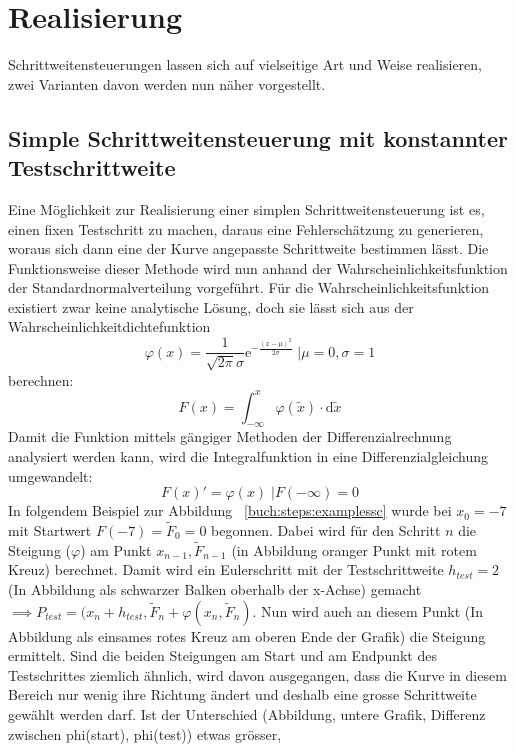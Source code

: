 %
%
%
\section{Realisierung
  \label{steps:section:loesung}}
Schrittweitensteuerungen lassen sich auf vielseitige Art und Weise realisieren,
zwei Varianten davon werden nun näher vorgestellt.

\subsection{Simple Schrittweitensteuerung mit konstannter Testschrittweite
  \label{steps:subsection:simplestep}}
Eine Möglichkeit zur Realisierung einer simplen Schrittweitensteuerung ist es, einen fixen Testschritt zu machen,
daraus eine Fehlerschätzung zu generieren, woraus sich dann eine der Kurve angepasste Schrittweite bestimmen lässt.
Die Funktionsweise dieser Methode wird nun anhand der Wahrscheinlichkeitsfunktion der Standardnormalverteilung vorgeführt.
Für die Wahrscheinlichkeitsfunktion existiert zwar keine analytische Lösung,
doch sie lässt sich aus der Wahrscheinlichkeitdichtefunktion
\[
  \varphi(x)=\frac{1}{\sqrt{2\pi}\sigma}\mathrm{e}^{-\frac{(x-\mu)^2}{2 \sigma}}\;|\mu=0,\sigma=1
\]
berechnen:
\[
  F(x)=\int_{-\infty}^{x} \varphi (\tilde{x}) \cdot \mathrm{d} \tilde{x}
\]
Damit die Funktion mittels gängiger Methoden der Differenzialrechnung analysiert werden kann,
wird die Integralfunktion in eine Differenzialgleichung umgewandelt:
\[
  F(x)'=\varphi(x)\;|F(-\infty)=0
\]
In folgendem Beispiel zur Abbildung ~\ref{buch:steps:examplessc} wurde bei $x_0=-7$ mit Startwert $F(-7)=\tilde{F}_0=0$ begonnen.
Dabei wird für den Schritt $n$ die Steigung ($\varphi$) am Punkt $x_{n-1}, \tilde{F}_{n-1}$ (in Abbildung oranger Punkt mit rotem Kreuz) berechnet.
Damit wird ein Eulerschritt mit der Testschrittweite $h_{test}=2$ (In Abbildung als schwarzer Balken oberhalb der x-Achse) gemacht
$\implies P_{test}=(x_n+h_{test}, \tilde{F}_n+\varphi(x_n, \tilde{F}_n)$.
Nun wird auch an diesem Punkt (In Abbildung als einsames rotes Kreuz am oberen Ende der Grafik) die Steigung ermittelt.
Sind die beiden Steigungen am Start und am Endpunkt des Testschrittes ziemlich ähnlich, wird davon ausgegangen,
dass die Kurve in diesem Bereich nur wenig ihre Richtung ändert und deshalb eine grosse Schrittweite gewählt werden darf.
Ist der Unterschied (Abbildung, untere Grafik, Differenz zwischen phi(start), phi(test)) etwas grösser,
